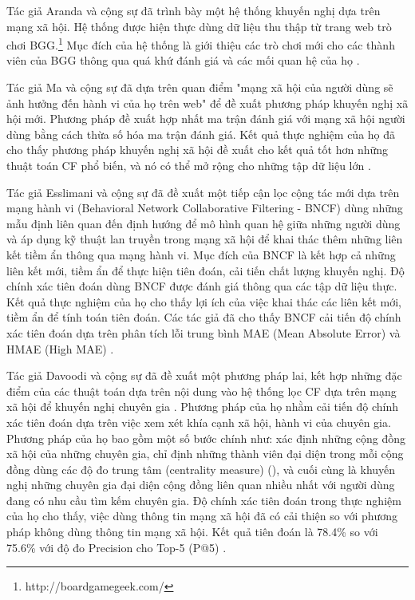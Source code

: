 Tác giả Aranda và cộng sự đã trình bày một hệ thống khuyến nghị dựa trên mạng xã hội. Hệ thống được hiện thực dùng dữ liệu thu thập từ trang web trò chơi BGG.\footnote{http://boardgamegeek.com/} Mục đích của hệ thống là giới thiệu các trò chơi mới cho các thành viên của BGG thông qua quá khứ đánh giá và các mối quan hệ của họ \cite{aranda2007online}.

Tác giả Ma và cộng sự đã dựa trên quan điểm "mạng xã hội của người dùng sẽ ảnh hưởng đến hành vi của họ trên web" để đề xuất phương pháp khuyến nghị xã hội mới. Phương pháp đề xuất hợp nhất ma trận đánh giá với mạng xã hội người dùng bằng cách thừa số hóa ma trận đánh giá. Kết quả thực nghiệm của họ đã cho thấy phương pháp khuyến nghị xã hội đề xuất cho kết quả tốt hơn những thuật toán CF phổ biến, và nó có thể mở rộng cho những tập dữ liệu lớn \cite{Ma:2008:SSR}. 

Tác giả Esslimani và cộng sự đã đề xuất một tiếp cận lọc cộng tác mới dựa trên mạng hành vi (Behavioral Network Collaborative Filtering - BNCF) dùng những mẫu định liên quan đến định hướng để mô hình quan hệ giữa những người dùng và áp dụng kỹ thuật lan truyền trong mạng xã hội để khai thác thêm những liên kết tiềm ẩn thông qua mạng hành vi. Mục đích của BNCF là kết hợp cả những liên kết mới, tiềm ẩn để thực hiện tiên đoán, cải tiến chất lượng khuyến nghị. Độ chính xác tiên đoán dùng BNCF được đánh giá thông qua các tập dữ liệu thực. Kết quả thực nghiệm của họ cho thấy lợi ích của việc khai thác các liên kết mới, tiềm ẩn để tính toán tiên đoán. Các tác giả đã cho thấy BNCF cải tiến độ chính xác tiên đoán dựa trên phân tích lỗi trung bình MAE (Mean Absolute Error) và HMAE (High MAE) \cite{Esslimani:2009:BehavioralNetwork}.

Tác giả Davoodi và cộng sự đã đề xuất một phương pháp lai, kết hợp những đặc điểm của các thuật toán dựa trên nội dung vào hệ thống lọc CF dựa trên mạng xã hội để khuyến nghị chuyên gia \cite{Davoodi:2012:SNA}. Phương pháp của họ nhằm cải tiến độ chính xác tiên đoán dựa trên việc xem xét khía cạnh xã hội, hành vi của chuyên gia. Phương pháp của họ bao gồm một số bước chính như: xác định những cộng đồng xã hội của những chuyên gia, chỉ định những thành viên đại diện trong mỗi cộng đồng dùng các độ đo trung tâm (centrality measure) (\citet{LarsKirchhoff:2008:SNAEnhanceIR}), và cuối cùng là khuyến nghị những chuyên gia đại diện cộng đồng liên quan nhiều nhất với người dùng đang có nhu cầu tìm kếm chuyên gia. Độ chính xác tiên đoán trong thực nghiệm của họ cho thấy, việc dùng thông tin mạng xã hội đã có cải thiện so với phương pháp không dùng thông tin mạng xã hội. Kết quả tiên đoán là 78.4\% so với 75.6\% với độ đo Precision cho Top-5 (P@5) \cite{Davoodi:2012:SNA}.

